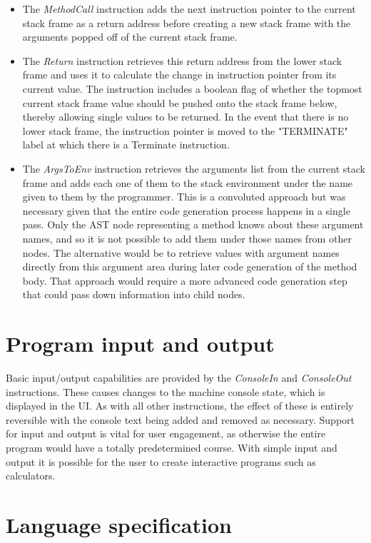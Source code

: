 \begin{itemize}
\item The \textit{MethodCall} instruction adds the next instruction pointer to the current stack frame as a return address before creating a new stack frame with the arguments popped off of the current stack frame.
\item The \textit{Return} instruction retrieves this return address from the lower stack frame and uses it to calculate the change in instruction pointer from its current value. The instruction includes a boolean flag of whether the topmost current stack frame value should be pushed onto the stack frame below, thereby allowing single values to be returned. In the event that there is no lower stack frame, the instruction pointer is moved to the "TERMINATE" label at which there is a Terminate instruction.
\item The \textit{ArgsToEnv} instruction retrieves the arguments list from the current stack frame and adds each one of them to the stack environment under the name given to them by the programmer. This is a convoluted approach but was necessary given that the entire code generation process happens in a single pass. Only the AST node representing a method knows about these argument names, and so it is not possible to add them under those names from other nodes. The alternative would be to retrieve values with argument names directly from this argument area during later code generation of the method body. That approach would require a more advanced code generation step that could pass down information into child nodes.
\end{itemize}

\section{Program input and output}

Basic input/output capabilities are provided by the \textit{ConsoleIn} and \textit{ConsoleOut} instructions. These causes changes to the machine console state, which is displayed in the UI. As with all other instructions, the effect of these is entirely reversible with the console text being added and removed as necessary. Support for input and output is vital for user engagement, as otherwise the entire program would have a totally predetermined course. With simple input and output it is possible for the user to create interactive programs such as calculators.

\section{Language specification}

